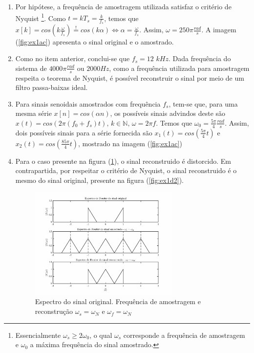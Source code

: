     \begin{enumerate}

        \item %
        
        Por hipótese, a frequência de amostragem utilizada satisfaz o critério de Nyquist \footnote{Essencialmente $\omega_s \geq 2\omega_0$, o qual $\omega_s$ corresponde a frequência de amostragem e $\omega_0$ a máxima frequência do sinal amostrado.}. Como $t = kT_s = \frac{k}{f_s}$, temos que $x[k] = cos(k \frac{\omega}{f_s})  \stackrel{!}{=} cos(k \alpha) \Longleftrightarrow \alpha = \frac{\omega}{f_s}$. Assim, $\omega = 250\pi \frac{rad}{s}$. A imagem (\ref{fig:ex1ac}) apresenta o sinal original e o amostrado.
        
        \item %
        
        Como no item anterior, conclui-se que $f_s = 12$ $kHz$. Dada frequência do sistema de $4000\pi \frac{rad}{s}$ ou $2000 Hz$, como a frequência utilizada para amostragem respeita o teorema de Nyquist, é possível reconstruir o sinal por meio de um filtro passa-baixas ideal. 
        
        \item %
        Para sinais senoidais amostrados com frequência $f_s$, tem-se que, para uma mesma série $x[n] = cos(\alpha n)$, os possíveis sinais advindos deste são $x(t) = cos(2 \pi (f_0 + f_s)t) \mbox{, } k \in \mathbb{N} \mbox{, } \omega = 2 \pi f$. Temos que $\omega_0 = \frac{5\pi}{4} \frac{rad}{s}$. Assim, dois possíveis sinais para a série fornecida são $x_1(t) = cos(\frac{5\pi}{4} t )$ e $x_2(t) = cos(\frac{85\pi}{4} t)$, mostrado na imagem (\ref{fig:ex1ac}) 
        
        \item %
        
        Para o caso presente na figura (\ref{fig:ex1d1}), o sinal reconstruido é distorcido. Em contrapartida, por respeitar o critério de Nyquist, o sinal reconstruido é o mesmo do sinal original, presente na figura (\ref{fig:ex1d2}).
        
        \newpage

        \begin{figure}[H]
            \centering
            \includegraphics[width=0.7\textwidth]{./images/ex1d1.eps}
            \caption{Espectro do sinal original. Frequência de amostragem e reconstrução $\omega_s = \omega_N$ e $\omega_f = \omega_N$}
            \label{fig:ex1d1}
        \end{figure}%
    

\end{enumerate}

